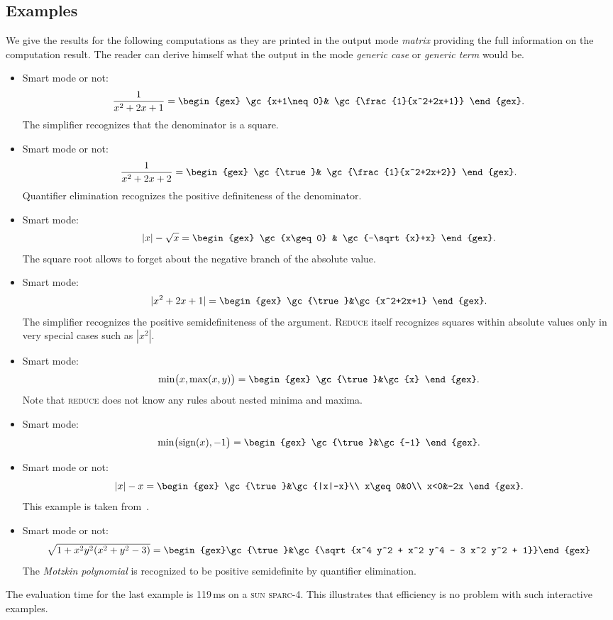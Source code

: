 \subsection{Examples}\label{examples}
We give the results for the following computations as they are printed
in the output mode {\em matrix} providing the full information on the
computation result. The reader can derive himself what the output in
the mode {\em generic case} or {\em generic term} would be.
\begin{itemize}
\item Smart mode or not:
\[
\frac{1}{x^2+2x+1}=\begin{gex}
\gc{x+1\neq0}& \gc{\frac{1}{x^2+2x+1}}
		   \end{gex}.
\]
The simplifier recognizes that the denominator is a square.
\item Smart mode or not:
\[
\frac{1}{x^2+2x+2}=\begin{gex}
\gc{\true}& \gc{\frac{1}{x^2+2x+2}}
		   \end{gex}.
\]
Quantifier elimination recognizes the positive definiteness of the
denominator.
\item Smart mode:
\[
|x|-\sqrt{x}=\begin{gex}
\gc{x\geq 0} & \gc{-\sqrt{x}+x}
	     \end{gex}.
\]
The square root allows to forget about the negative branch of the
absolute value.
\item Smart mode:
\[
|x^2+2x+1|=\begin{gex}
\gc{\true}&\gc{x^2+2x+1}
	   \end{gex}.
\]
The simplifier recognizes the positive semidefiniteness of
the argument. \textsc{Reduce} itself recognizes squares within absolute values
only in very special cases such as $|x^2|$.
\item Smart mode:
\[
\min\bigl(x,\max(x,y)\bigr)=\begin{gex}
\gc{\true}&\gc{x}
		  \end{gex}.
\]
Note that \textsc{reduce} does not know any rules about nested minima and
maxima.
\item
Smart mode:
\[
\min\bigl(\sign(x),-1\bigr)=\begin{gex}
\gc{\true}&\gc{-1}
		  \end{gex}.
\]
\item Smart mode or not:
\[
|x|-x=\begin{gex}
\gc{\true}&\gc{|x|-x}\\
x\geq0&0\\
x<0&-2x
      \end{gex}.
\]
This example is taken from~\cite{DavenportFaure:94}.
\item
Smart mode or not:
\[
\sqrt{1+x^2 y^2 (x^2+y^2-3)}={}
\begin{gex}\gc{\true}&\gc{\sqrt{x^4 y^2 + x^2 y^4 - 3 x^2 y^2 + 1}}\end{gex}
\]
The {\em Motzkin polynomial} is recognized to be positive semidefinite
by quantifier elimination.
\end{itemize}
The evaluation time for the last example is 119\,ms on a \textsc{sun
sparc-4}. This illustrates that efficiency is no problem with such
interactive examples.
